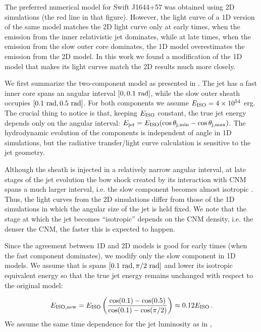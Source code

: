 \documentclass[usenatbib,fleqn]{mnras}
\begin{document}
The preferred numerical model for Swift J1644+57 \citep[Fig.10
in][]{Mimica+2015} was obtained using 2D simulations (the red line in
that figure). However, the light curve of a 1D version of the same
model \citep[black line in Fig. 10 in][see also section 4.2 of that
paper]{Mimica+2015} matches the 2D light curve only at early times,
when the emission from the inner relativistic jet dominates, while at
late times, when the emission from the slow outer core dominates, the
1D model overestimates the emission from the 2D model. In this work we
found a modification of the 1D model that makes its light curves
match the 2D results much more closely.

We first summarize the two-component model as presented in
\citet{Mimica+2015}. The jet has a fast inner core spans an angular
interval $[0, 0.1\ {\rm rad}]$, while the slow outer sheath occupies
$[0.1\ {\rm rad}, 0.5\ {\rm rad}]$. For both components we assume
$E_{\rm ISO} = 4\times 10^{54}$ erg. The crucial thing to notice is
that, keeping $E_{\rm ISO}$ constant, the true jet energy depends only
on the angular interval: $E_{\rm jet} = E_{\rm ISO} (\cos\theta_{\rm
  j,min} - \cos\theta_{\rm j,max})$. The hydrodynamic evolution of the
components is independent of angle in 1D simulations, but the
radiative transfer/light curve calculation is sensitive to the jet
geometry.

Although the sheath is injected in a relatively
narrow angular interval, at late stages of the jet evolution the bow
shock created by its interaction with CNM spans a much larger interval,
i.e. the slow component becomes almost isotropic \citep[bottom two
panels in Fig. 8 in][]{Mimica+2015}. Thus, the light curves from the
2D simulations differ from those of the 1D simulations in which the
angular size of the jet is held fixed. We note that the stage at
which the jet becomes ``isotropic'' depends on the CNM density,
i.e. the denser the CNM, the faster this is expected to happen.

Since the agreement between 1D and 2D models is good for early times
(when the fast component dominates), we modify only the slow component
in 1D models. We assume that is spans $[0.1\ {\rm rad}, \pi/2\ {\rm
  rad}]$ and lower its isotropic equivalent energy so that the true
jet energy remains unchanged with respect to the original model:

\begin{equation}\label{eq:Eiso}
 E_{\rm ISO, new} = E_{\rm ISO} \left(\frac{\cos(0.1) - \cos(0.5)}{\cos(0.1) - \cos(\pi/2)}\right)\approx 0.12 E_{\rm ISO}\, .
\end{equation}
%
We assume the same time dependence for the jet luminosity as in
\citet{Mimica+2015},
\end{document}

